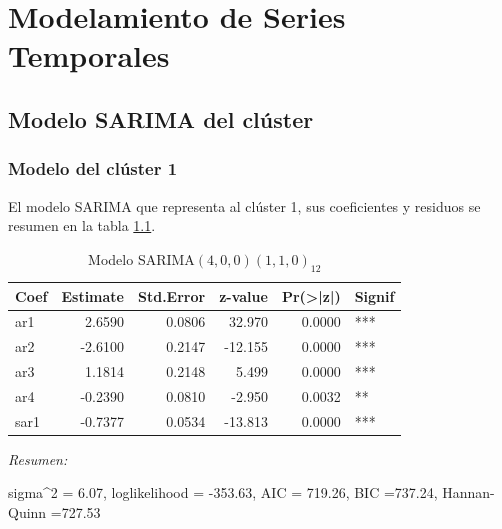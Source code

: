\documentclass[12pt,oneside]{book}\usepackage[]{graphicx}\usepackage[]{color}
\newenvironment{knitrout}{}{} %
\theoremstyle{definition} %
\begin{document}






\chapter{Modelamiento de Series Temporales}


\section{Modelo SARIMA del clúster}
\label{ap:sarima}







\subsection{Modelo del clúster 1}




El modelo SARIMA que representa al clúster 1, sus coeficientes y residuos se resumen en la tabla \ref{tab:sarima_cl1}.

\begin{knitrout}
\color{fgcolor}\begin{table}

\caption{\label{tab:unnamed-chunk-74}\label{tab:sarima_cl1}Modelo SARIMA$(4,0,0)(1,1,0)_{12}$}
\centering
\begin{threeparttable}
\begin{tabular}[t]{lrrrrl}
\toprule
Coef & Estimate & Std.Error & z-value & Pr(>|z|) & Signif\\
\midrule
\rowcolor{gray!6}  ar1 & 2.6590 & 0.0806 & 32.970 & 0.0000 & ***\\
ar2 & -2.6100 & 0.2147 & -12.155 & 0.0000 & ***\\
\rowcolor{gray!6}  ar3 & 1.1814 & 0.2148 & 5.499 & 0.0000 & ***\\
ar4 & -0.2390 & 0.0810 & -2.950 & 0.0032 & **\\
\rowcolor{gray!6}  sar1 & -0.7377 & 0.0534 & -13.813 & 0.0000 & ***\\
\bottomrule
\end{tabular}
\begin{tablenotes}
\item \textit{Resumen:} 
\item sigma\textasciicircum{}2 = 6.07, loglikelihood = -353.63, AIC = 719.26, BIC =737.24, Hannan-Quinn =727.53
\end{tablenotes}
\end{threeparttable}
\end{table}


\end{knitrout}
\end{document}
